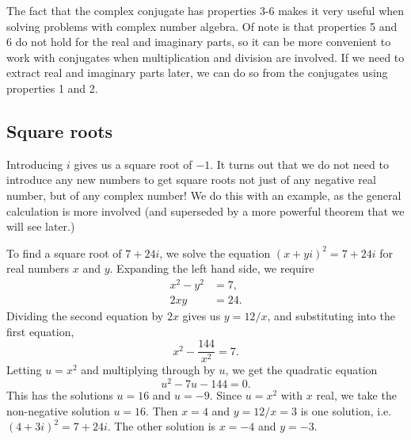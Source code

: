 The fact that the complex conjugate has properties 3-6 makes it very useful when solving problems with complex number algebra. Of note is that properties 5 and 6 do not hold for the real and imaginary parts, so it can be more convenient to work with conjugates when multiplication and division are involved. If we need to extract real and imaginary parts later, we can do so from the conjugates using properties 1 and 2.


\subsection{Square roots}

Introducing $i$ gives us a square root of $-1$. It turns out that we do not need to introduce any new numbers to get square roots not just of any negative real number, but of any complex number! We do this with an example, as the general calculation is more involved (and superseded by a more powerful theorem that we will see later.)

\begin{example}
To find a square root of $7 + 24i$, we solve the equation $(x + yi)^2 = 7 + 24i$ for real numbers $x$ and $y$. Expanding the left hand side, we require
\begin{align}
x^2 - y^2 &= 7, \\
2xy &= 24.
\end{align}
Dividing the second equation by $2x$ gives us $y = 12/x$, and substituting into the first equation,
\begin{equation}
x^2 - \frac{144}{x^2} = 7.
\end{equation}
Letting $u = x^2$ and multiplying through by $u$, we get the quadratic equation
\begin{equation}
u^2 - 7u - 144 = 0.
\end{equation}
This has the solutions $u = 16$ and $u = -9$. Since $u = x^2$ with $x$ real, we take the non-negative solution $u = 16$. Then $x = 4$ and $y = 12/x = 3$ is one solution, i.e. $(4 + 3i)^2 = 7 + 24i$. The other solution is $x = -4$ and $y = -3$.
\end{example}